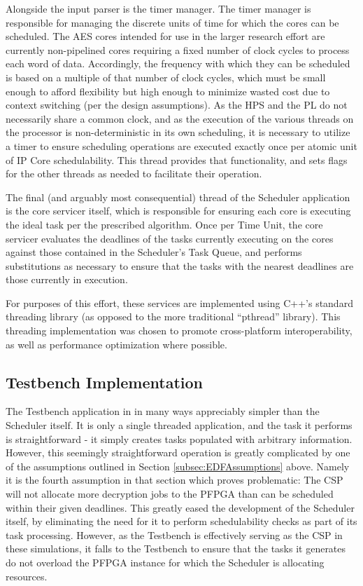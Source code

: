Alongside the input parser is the timer manager. The timer manager is responsible for managing the discrete units of time for which the cores can be scheduled. The AES cores intended for use in the larger research effort are currently non-pipelined cores requiring a fixed number of clock cycles to process each word of data. Accordingly, the frequency with which they can be scheduled is based on a multiple of that number of clock cycles, which must be small enough to afford flexibility but high enough to minimize wasted cost due to context switching (per the design assumptions). As the HPS and the PL do not necessarily share a common clock, and as the execution of the various threads on the processor is non-deterministic in its own scheduling, it is necessary to utilize a timer to ensure scheduling operations are executed exactly once per atomic unit of IP Core schedulability. This thread provides that functionality, and sets flags for the other threads as needed to facilitate their operation.

The final (and arguably most consequential) thread of the Scheduler application is the core servicer itself, which is responsible for ensuring each core is executing the ideal task per the prescribed algorithm. Once per Time Unit, the core servicer evaluates the deadlines of the tasks currently executing on the cores against those contained in the Scheduler's Task Queue, and performs substitutions as necessary to ensure that the tasks with the nearest deadlines are those currently in execution. 

For purposes of this effort, these services are implemented using C++'s standard threading library (as opposed to the more traditional ``pthread'' library). This threading implementation was chosen to promote cross-platform interoperability, as well as performance optimization where possible.


\subsection{Testbench Implementation}\label{subsec:TestbenchImpl}
The Testbench application in in many ways appreciably simpler than the Scheduler itself. It is only a single threaded application, and the task it performs is straightforward - it simply creates tasks populated with arbitrary information. However, this seemingly straightforward operation is greatly complicated by one of the assumptions outlined in Section \ref{subsec:EDFAssumptions} above. Namely it is the fourth assumption in that section which proves problematic: The CSP will not allocate more decryption jobs to the PFPGA than can be scheduled within their given deadlines. This greatly eased the development of the Scheduler itself, by eliminating the need for it to perform schedulability checks as part of its task processing. However, as the Testbench is effectively serving as the CSP in these simulations, it falls to the Testbench to ensure that the tasks it generates do not overload the PFPGA instance for which the Scheduler is allocating resources.

